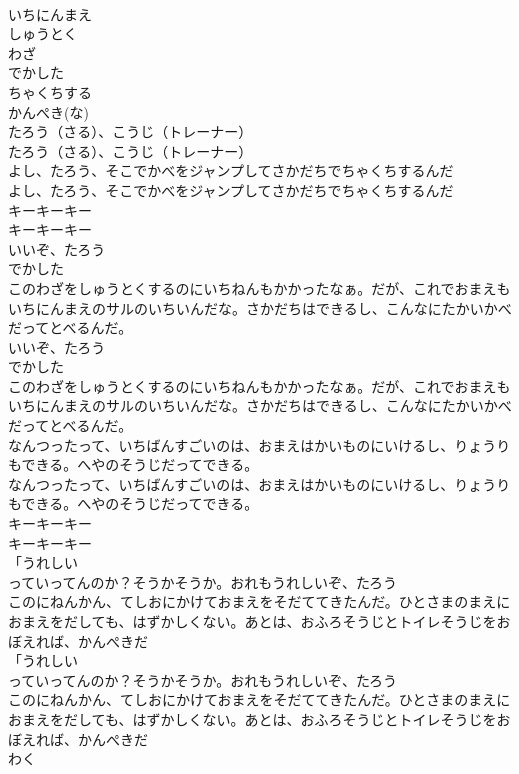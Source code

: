 \documentclass[8pt]{extreport}
\begin{document}
\begin{CJK}{UTF8}{min}
\\	いちにんまえ
\\	しゅうとく
\\	わざ
\\	でかした
\\	ちゃくちする
\\	かんぺき(な)
\\	たろう（さる）、こうじ（トレーナー）
\\	たろう（さる）、こうじ（トレーナー）
\\	よし、たろう、そこでかべをジャンプしてさかだちでちゃくちするんだ
\\	よし、たろう、そこでかべをジャンプしてさかだちでちゃくちするんだ
\\	キーキーキー
\\	キーキーキー
\\	いいぞ、たろう
\\	でかした
\\	このわざをしゅうとくするのにいちねんもかかったなぁ。だが、これでおまえもいちにんまえのサルのいちいんだな。さかだちはできるし、こんなにたかいかべだってとべるんだ。
\\	いいぞ、たろう
\\	でかした
\\	このわざをしゅうとくするのにいちねんもかかったなぁ。だが、これでおまえもいちにんまえのサルのいちいんだな。さかだちはできるし、こんなにたかいかべだってとべるんだ。
\\	なんつったって、いちばんすごいのは、おまえはかいものにいけるし、りょうりもできる。へやのそうじだってできる。
\\	なんつったって、いちばんすごいのは、おまえはかいものにいけるし、りょうりもできる。へやのそうじだってできる。
\\	キーキーキー
\\	キーキーキー
\\	「うれしい
\\	っていってんのか？そうかそうか。おれもうれしいぞ、たろう
\\	このにねんかん、てしおにかけておまえをそだててきたんだ。ひとさまのまえにおまえをだしても、はずかしくない。あとは、おふろそうじとトイレそうじをおぼえれば、かんぺきだ
\\	「うれしい
\\	っていってんのか？そうかそうか。おれもうれしいぞ、たろう
\\	このにねんかん、てしおにかけておまえをそだててきたんだ。ひとさまのまえにおまえをだしても、はずかしくない。あとは、おふろそうじとトイレそうじをおぼえれば、かんぺきだ
\\	わく

\end{CJK}
\end{document}
